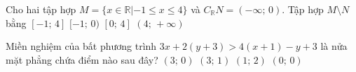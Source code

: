 \begin{ex}%
	Cho hai tập hợp $M=\{x\in\mathbb{R}|-1\leq x\leq 4\}$ và $C_\mathbb{R}N=(-\infty;\,0)$. Tập hợp $M\setminus N$ bằng
	\choice
	{$[-1;\,4]$}
	{\True $[-1;\,0)$}
	{$[0;\,4]$}
	{$(4;\,+\infty)$}
	\loigiai{
	Ta có $M=[-1;\,4]$; $N=[0;\,+\infty)$. Suy ra $M\setminus N=[-1;\,0)$.
	}
\end{ex}
\begin{ex}%
	Miền nghiệm của bất phương trình $3x+2(y+3)>4(x+1)-y+3$ là nửa mặt phẳng chứa điểm nào sau đây?
	\choice
	{$(3;\,0)$}
	{$(3;\,1)$}
	{\True $(1;\,2)$}
	{$(0;\,0)$}
\end{ex}
